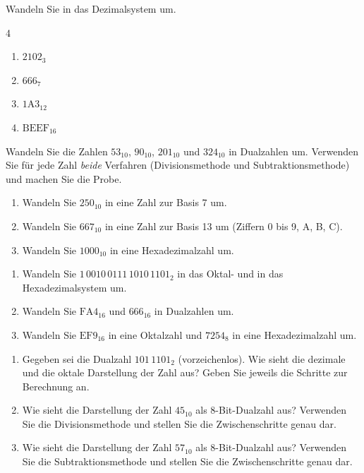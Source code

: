 \aufgaben
{}
Wandeln Sie in das Dezimalsystem um.
\begin{multicols}{4}
\begin{enumerate}[label=\alph*)]
\item $2102_3$
\item $666_7$
\item $\mathrm{1A3}_{12}$
\item $\mathrm{BEEF}_{16}$
\end{enumerate}
\end{multicols}

Wandeln Sie die Zahlen $53_{10}$, $90_{10}$, $201_{10}$ und $324_{10}$ in Dualzahlen um. Verwenden Sie für jede Zahl \emph{beide} Verfahren (Divisionsmethode und Subtraktionsmethode) und machen Sie die Probe.

\begin{enumerate}[label=\alph*)]
\item Wandeln Sie $250_{10}$ in eine Zahl zur Basis 7 um.
\item Wandeln Sie $667_{10}$ in eine Zahl zur Basis 13 um (Ziffern 0 bis 9, A, B, C).
\item Wandeln Sie $1000_{10}$ in eine Hexadezimalzahl um.
\end{enumerate}

\begin{enumerate}[label=\alph*)]
\item Wandeln Sie $1\,0010\,0111\,1010\,1101_2$ in das Oktal- und in das Hexadezimalsystem um.
\item Wandeln Sie $\mathrm{FA4}_{16}$ und $666_{16}$ in Dualzahlen um.
\item Wandeln Sie $\mathrm{EF9}_{16}$ in eine Oktalzahl und $7254_8$ in eine Hexadezimalzahl um.
\end{enumerate}

\begin{enumerate}[label=\alph*)]
\item Gegeben sei die Dualzahl $101\,1101_2$ (vorzeichenlos). Wie sieht die dezimale und die oktale Darstellung der Zahl aus? Geben Sie jeweils die Schritte zur Berechnung an.
\item Wie sieht die Darstellung der Zahl $45_{10}$ als 8-Bit-Dualzahl aus? Verwenden Sie die Divisionsmethode und stellen Sie die Zwischenschritte genau dar.
\item Wie sieht die Darstellung der Zahl $57_{10}$ als 8-Bit-Dualzahl aus? Verwenden Sie die Subtraktionsmethode und stellen Sie die Zwischenschritte genau dar.
\end{enumerate}

